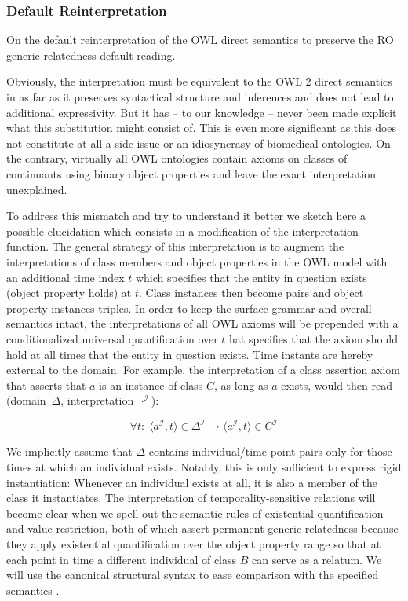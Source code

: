\documentclass[10pt]{bmc_article}
\newcommand{\mclass}[1]{\ensuremath{\mathit{#1}}}
\newcommand{\dlint}[1]{\ensuremath{#1^{\mathcal{I}}}}
\newcommand{\pair}[2]{\ensuremath{\langle #1,#2\rangle}}
\newenvironment{bmcformat}{\baselineskip20pt\sloppy\setboolean{publ}{false}}{\baselineskip20pt\sloppy}
\begin{document}
\begin{bmcformat}
\subsubsection*{Default Reinterpretation}

On the default reinterpretation of the OWL direct semantics to preserve the RO 
generic relatedness default reading. 

Obviously, the interpretation must be equivalent to the OWL 2 direct semantics
\cite{OWL2:direct} in as far as it preserves syntactical structure and inferences and does not
lead to additional expressivity. But it has – to our knowledge – never been made
explicit what this substitution might consist of.  This is even more significant
as this does not constitute at all a side issue or an idiosyncrasy of biomedical
ontologies. On the contrary, virtually all OWL ontologies contain axioms on
classes of continuants using binary object properties and leave the exact
interpretation unexplained. 

To address this mismatch and try to understand it better we sketch here a
possible elucidation  which consists in a modification of the interpretation
function. The general strategy of this interpretation is to augment the
interpretations of class members and object properties in the OWL model with an
additional time index $t$ which specifies that the entity in question exists
(object property holds) at $t$. Class instances then become pairs and object
property instances triples. In order to keep the surface grammar and overall
semantics intact, the interpretations of all OWL axioms will be prepended with a
conditionalized universal quantification over $t$  hat specifies that the axiom
should hold at all times that the entity in question exists.  Time instants are
hereby external to the domain. For example, the interpretation of a class
assertion axiom that asserts that $a$ is an instance of class \mclass{C}, as long
as $a$ exists, would then read (domain~$\Delta$, interpretation~$\cdot^\mathcal{I}$):

\begin{equation}
\forall t:\;\pair{\dlint{a}}{t}\in \dlint{\Delta} \rightarrow
\pair{\dlint{a}}{t} \in \dlint{\mclass{C}}
\end{equation}

We implicitly assume that $\Delta$ contains individual/time-point pairs only for
those times at which an individual exists. Notably, this is only sufficient to express rigid instantiation: Whenever an individual exists at
all, it is also a member of the class it instantiates. The interpretation of
temporality-sensitive relations will become clear when we spell out the semantic
rules of existential quantification and value restriction, both of which assert
permanent generic relatedness because they apply existential quantification over the
object property range so that at each point in time a different individual of
class \mclass{B} can serve as a relatum. We will use the canonical structural syntax
\cite{OWL2:structural}
to ease comparison with the specified semantics \cite{OWL2:direct}.


\end{bmcformat}
\end{document}
